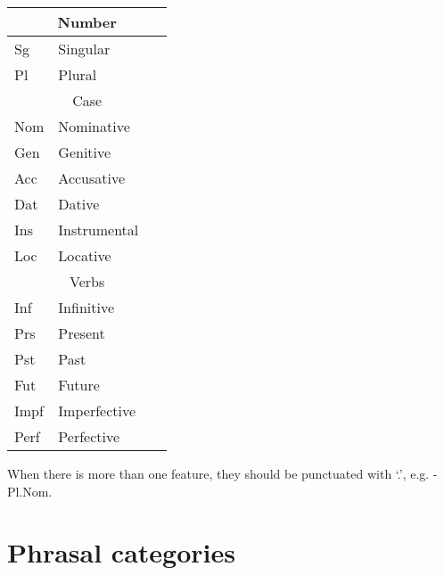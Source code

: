 \documentclass[a4paper,11pt, onecolumn,twoside]{article}
\begin{document}
\begin{tabular}{lll}
\multicolumn{3}{c}{Number} \\
\hline
Sg  & Singular & ~ \\
Pl  & Plural & ~ \\

\multicolumn{3}{c}{Case} \\
\hline
Nom & Nominative & ~ \\
Gen & Genitive & ~ \\
Acc & Accusative & ~ \\
Dat & Dative & ~ \\
Ins & Instrumental & ~ \\
Loc & Locative & ~ \\

\multicolumn{3}{c}{Verbs} \\
\hline
Inf & Infinitive & ~ \\
Prs & Present   & ~ \\
Pst & Past & ~ \\
Fut & Future    & ~ \\
Impf & Imperfective & ~ \\
Perf & Perfective & ~ \\

\end{tabular}

When there is more than one feature, they should be punctuated with `.', e.g. -Pl.Nom.

\section{Phrasal categories}
\end{document}
